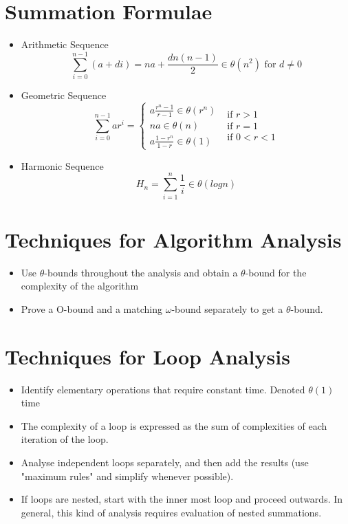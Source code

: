 \documentclass{article}
\begin{document}
\section{Summation Formulae}
\begin{itemize}
\item Arithmetic Sequence 
\[\sum_{i=0}^{n-1} (a + di) = na + \frac{dn(n-1)}{2} \in \theta (n^2) \text{ for } d \neq 0\]
\item Geometric Sequence 
\[\sum_{i=0}^{n-1} a r^i = \begin{cases}a \frac{r^n -1}{r -1} \in \theta(r^n) \\ na \in \theta(n) \\ a \frac{1 - r^n}{1 -r} \in \theta(1)\end{cases} \begin{matrix}
\text { if } r > 1 \\ \text{ if } r = 1 \\ \text{ if } 0 < r < 1 \end{matrix}\]
\item Harmonic Sequence 
\[H_n = \sum_{i = 1}^{n} \frac{1}{i} \in \theta (log n)\]
\end{itemize}
\section{Techniques for Algorithm Analysis }
\begin{itemize}
\item Use \(\theta\)-bounds throughout the analysis and obtain a \(\theta\)-bound for the complexity of the algorithm
\item Prove a O-bound and a matching \(\omega\)-bound separately to get a \(\theta\)-bound.   
\end{itemize}

\section{Techniques for Loop Analysis}
\begin{itemize}
\item Identify elementary operations that require constant time. Denoted \( \theta (1) \) time
\item The complexity of a loop is expressed as the sum of complexities of each iteration of the loop.
\item Analyse independent loops separately, and then add the results (use "maximum rules" and simplify whenever possible).
\item If loops are nested, start with the inner most loop and proceed outwards. In general, this kind of analysis requires evaluation of nested summations.
\end{itemize}
\end{document}
